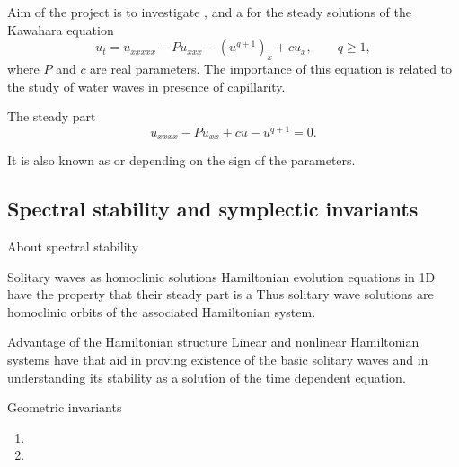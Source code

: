 \documentclass[9pt, english]{beamer}
\theoremstyle{definition}
\begin{document}
\begin{frame}{Aim of the project is to}
 investigate \pause
{}, \pause
{} \pause and a
 \pause
for the steady solutions of the Kawahara equation
\[
u_t=u_{xxxxx}-Pu_{xxx}-(u^{q+1})_x +c u_x, \qquad q \geq 1,
\]
where $P$ and $ c$ are real parameters.\pause
The importance of this equation is related to the study of water waves in presence of capillarity.\pause

    \begin{block}{The steady part}
        \[
        u_{xxxx}-Pu_{xx} + cu -u^{q+1}=0.
        \]
    \end{block}\pause
        It is also known as  or  depending on the sign of the parameters.
\end{frame}

\subsection{Spectral stability and symplectic invariants}
\begin{frame}{About spectral stability}
    \begin{block}{Solitary waves as homoclinic solutions}
        Hamiltonian evolution equations in 1D have the property that
        their steady part is a  \pause Thus solitary wave solutions are homoclinic
        orbits of the associated Hamiltonian system.
    \end{block}
    \pause
    \begin{block}{Advantage of the Hamiltonian structure}
        Linear and nonlinear Hamiltonian systems have  that aid in proving existence of the
        basic solitary waves \pause and in understanding its stability as a
        solution of the time dependent equation.
    \end{block}\pause
    \begin{block}{Geometric invariants}
    \begin{enumerate}
    \item {}
    \item {}
    \end{enumerate}
    \end{block}
    \end{frame}
\end{document}
